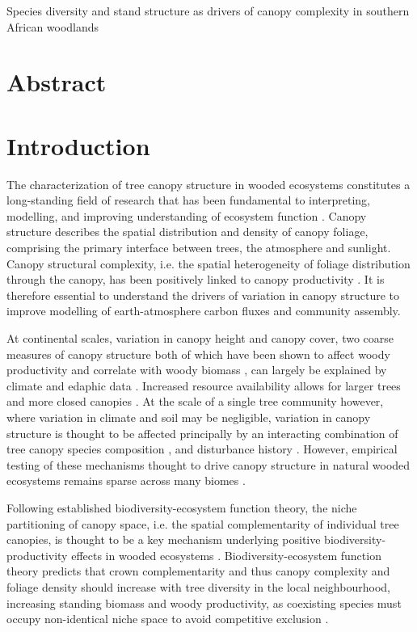 \documentclass[11pt,a4paper]{article}
\newcommand{\titletext}{Species diversity and stand structure as drivers of canopy complexity in southern African woodlands}
\begin{document}
{\LARGE{\titletext{}}}

\linenumbers

\section*{Abstract}

\section{Introduction}

The characterization of tree canopy structure in wooded ecosystems constitutes a long-standing field of research that has been fundamental to interpreting, modelling, and improving understanding of ecosystem function \citep{Watt1947, Whittaker1969, Horn1971, Maarel1996}. Canopy structure describes the spatial distribution and density of canopy foliage, comprising the primary interface between trees, the atmosphere and sunlight. Canopy structural complexity, i.e. the spatial heterogeneity of foliage distribution through the canopy, has been positively linked to canopy productivity \citep{Hardiman2011,Chen2012,Law2001,Baldochii2001,Morin2015}. It is therefore essential to understand the drivers of variation in canopy structure to improve modelling of earth-atmosphere carbon fluxes and community assembly. 

At continental scales, variation in canopy height and canopy cover, two coarse measures of canopy structure both of which have been shown to affect woody productivity and correlate with woody biomass \citep{}, can largely be explained by climate and edaphic data \citep{GEDI}. Increased resource availability allows for larger trees and more closed canopies \citep{}. At the scale of a single tree community however, where variation in climate and soil may be negligible, variation in canopy structure is thought to be affected principally by an interacting combination of tree canopy species composition \citep{}, and disturbance history \citep{}. However, empirical testing of these mechanisms thought to drive canopy structure in natural wooded ecosystems remains sparse across many biomes \citep{}.

Following established biodiversity-ecosystem function theory, the niche partitioning of canopy space, i.e. the spatial complementarity of individual tree canopies, is thought to be a key mechanism underlying positive biodiversity-productivity effects in wooded ecosystems \citep{Pretzsch2014, Barry2019}. Biodiversity-ecosystem function theory predicts that crown complementarity and thus canopy complexity and foliage density should increase with tree diversity in the local neighbourhood, increasing standing biomass and woody productivity, as coexisting species must occupy non-identical niche space to avoid competitive exclusion \citep{Gadow1993}. 
\end{document}
